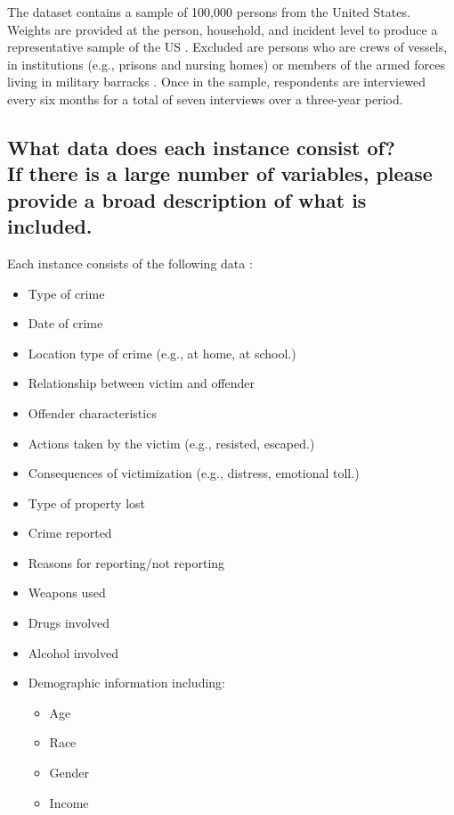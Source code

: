 \documentclass[letterpaper, 10 pt, conference]{ieeeconf}  %
\newcommand{\subtitle}[1]{{\\ \small \normalfont \color{purple} #1}}
\begin{document}
The dataset contains a sample of 100,000 persons from the United States. Weights are provided at the person, household, and incident level to produce a representative sample of the US \cite{ncvs_data_coodbook}. Excluded are persons who are crews of vessels, in institutions (e.g., prisons and nursing homes) or members of the armed forces living in military barracks \cite{ncvs_data_coodbook}. Once in the sample, respondents are interviewed every six months for a total of seven interviews over a three-year period.

\subsection{What data does each instance consist of? \subtitle{If there is a large number of variables, please provide a broad description of what is included.}}

Each instance consists of the following data \cite{ncvs_data_coodbook}:

\begin{itemize}
    \item Type of crime
    \item Date of crime
    \item Location type of crime (e.g., at home, at school.)
    \item Relationship between victim and offender
    \item Offender characteristics
    \item Actions taken by the victim (e.g., resisted, escaped.)
    \item Consequences of victimization (e.g., distress, emotional toll.)
    \item Type of property lost
    \item Crime reported
    \item Reasons for reporting/not reporting
    \item Weapons used
    \item Drugs involved
    \item Alcohol involved
    \item Demographic information including:
    \begin{itemize}
        \item Age
        \item Race
        \item Gender
        \item Income
    \end{itemize}
\end{itemize}
\end{document}
